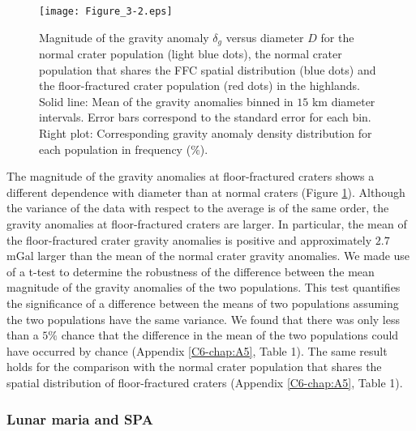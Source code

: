 \begin{figure}[h!]
  \graphicspath{ {/Users/thorey/Documents/These/Projet/FFC/Gravi_GRAIL/Article/Papier/Proof/} }
  \begin{center}

    \texttt{[image: Figure\_3-2.eps]}
    \caption{Magnitude  of  the   gravity  anomaly  $\delta_g$  versus
      diameter $D$ for the normal crater population (light blue dots),
      the  normal  crater  population  that  shares  the  FFC  spatial
      distribution   (blue  dots)   and  the   floor-fractured  crater
      population (red dots) in the  highlands. Solid line: Mean of the
      gravity anomalies  binned in $15$ km  diameter intervals.  Error
      bars correspond to the standard error for each bin.  Right plot:
      Corresponding  gravity  anomaly  density distribution  for  each
      population in frequency ($\%$).}
    \label{C6-Figure3-2}
  \end{center}
\end{figure}

The  magnitude of  the  gravity anomalies  at floor-fractured  craters
shows  a different  dependence with  diameter than  at normal  craters
(Figure  \ref{C6-Figure3-2}).  Although  the  variance of  the data  with
respect to the average is of  the same order, the gravity anomalies at
floor-fractured craters  are larger.  In  particular, the mean  of the
floor-fractured crater gravity anomalies is positive and approximately
$2.7$  mGal  larger  than  the  mean  of  the  normal  crater  gravity
anomalies.  We made use of a t-test to determine the robustness of the
difference between the mean magnitude  of the gravity anomalies of the
two  populations.    This  test  quantifies  the   significance  of  a
difference  between the  means  of two  populations  assuming the  two
populations have the same variance.  We found that there was only less
than  a $5\%$  chance  that the  difference  in the  mean  of the  two
populations  could have  occurred by  chance (Appendix  \ref{C6-chap:A5},
Table 1).   The same result holds  for the comparison with  the normal
crater   population   that   shares  the   spatial   distribution   of
floor-fractured craters (Appendix \ref{C6-chap:A5}, Table 1).

\subsubsection{Lunar maria and SPA}
\label{C6-sec:lunar-maria-spa}
  
